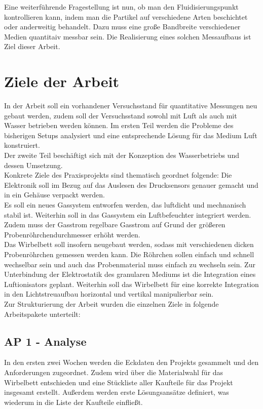 Eine weiterführende Fragestellung ist nun, ob man den Fluidisierungspunkt kontrollieren kann, indem man die Partikel auf verschiedene Arten beschichtet oder anderweitig behandelt. Dazu muss eine große Bandbreite verschiedener Medien quantitaiv messbar sein. Die Realisierung eines solchen Messaufbaus ist Ziel dieser Arbeit. 


\section{Ziele der Arbeit}

In der Arbeit soll ein vorhandener Versuchsstand für quantitative Messungen neu gebaut werden, zudem soll der Versuchsstand sowohl mit Luft als auch mit Wasser betrieben werden können. Im ersten Teil werden die Probleme des bisherigen Setups analysiert und eine entsprechende Lösung für das Medium Luft konstruiert. \\ 
Der zweite Teil beschäftigt sich mit der Konzeption des Wasserbetriebs und dessen Umsetzung. \\
Konkrete Ziele des Praxisprojekts sind thematisch geordnet folgende:
Die Elektronik soll im Bezug auf das Auslesen des Drucksensors genauer gemacht und in ein Gehäuse verpackt werden. \\
Es soll ein neues Gassystem entworfen werden, das luftdicht und mechnanisch stabil ist. Weiterhin soll in das Gassystem ein Luftbefeuchter integriert werden. Zudem muss der Gasstrom regelbare Gasstrom auf Grund der größeren Probenröhrchendurchmesser erhöht werden.  \\
Das Wirbelbett soll insofern neugebaut werden, sodass mit verschiedenen dicken Probenröhrchen gemessen werden kann. Die Röhrchen sollen einfach und schnell wechselbar sein und auch das Probenmaterial muss einfach zu wechseln sein. Zur Unterbindung der Elektrostatik des granularen Mediums ist die Integration eines Luftionisators geplant. Weiterhin soll das Wirbelbett für eine korrekte Integration in den Lichtstreuaufbau horizontal und vertikal manipulierbar sein. \\
Zur Strukturierung der Arbeit wurden die einzelnen Ziele in folgende Arbeitspakete unterteilt:


\subsection{AP 1 - Analyse}

In den ersten zwei Wochen werden die Eckdaten den Projekts gesammelt und den Anforderungen zugeordnet. Zudem wird über die Materialwahl für das Wirbelbett entschieden und eine Stückliste aller Kaufteile für das Projekt insgesamt erstellt. Außerdem werden erste Lösungsansätze definiert, was wiederum in die Liste der Kaufteile einfließt.


